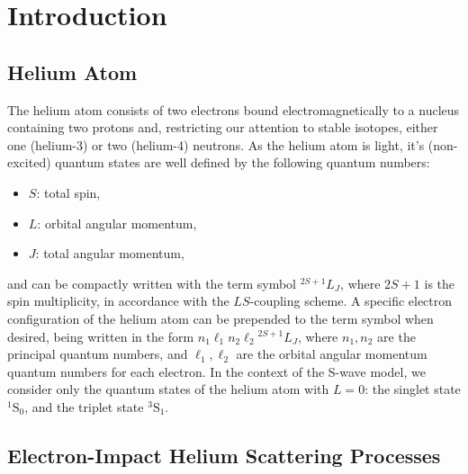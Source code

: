 \documentclass[]{article}
\def\mainmatter{%
    \pagenumbering{arabic}
    \setcounter{page}{1}
    \setcounter{section}{0}
    \renewcommand{\thesection}{\arabic{section}}
}%
\begin{document}
\clearpage

\mainmatter

\section{Introduction}
\label{sec:in}



\subsection{Helium Atom}
\label{sec:in-he}

The helium atom consists of two electrons bound electromagnetically to a nucleus
containing two protons and, restricting our attention to stable isotopes, either
one (helium-3) or two (helium-4) neutrons.
As the helium atom is light, it's (non-excited) quantum states are well defined
by the following quantum numbers:
\begin{itemize}
\item $S$: total spin,
\item $L$: orbital angular momentum,
\item $J$: total angular momentum,
\end{itemize}
and can be compactly written with the term symbol ${}^{2S + 1}L_{J}$, where
$2S + 1$ is the spin multiplicity, in accordance with the $LS$-coupling scheme.
A specific electron configuration of the helium atom can be prepended to the
term symbol when desired, being written in the form
$n_{1}\ell_{1} n_{2}\ell_{2} {}^{2S + 1}L_{J}$, where $n_{1}, n_{2}$ are the
principal quantum numbers, and $\ell_{1}, \ell_{2}$ are the orbital angular
momentum quantum numbers for each electron.
In the context of the S-wave model, we consider only the quantum states of the
helium atom with $L = 0$: the singlet state ${}^{1}\mathrm{S}_{0}$, and the
triplet state ${}^{3}\mathrm{S}_{1}$.

\subsection{Electron-Impact Helium Scattering Processes}
\label{sec:in-proc}
\end{document}
